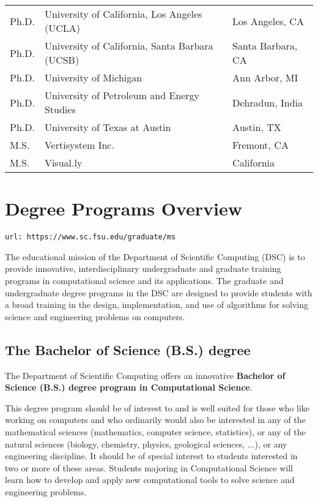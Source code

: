 \documentclass[12pt,a4paper]{article}
\begin{document}
\begin{center}
\begin{tabular}{l p{8cm} l}
Ph.D. & University of California, Los Angeles (UCLA) & Los Angeles, CA \\
Ph.D. & University of California, Santa Barbara (UCSB) & Santa Barbara, CA \\
Ph.D. & University of Michigan & Ann Arbor, MI \\
Ph.D. & University of Petroleum and Energy Studies & Dehradun, India \\
Ph.D. & University of Texas at Austin & Austin, TX \\
M.S. & Vertisystem Inc. & Fremont, CA \\
M.S. & Visual.ly & California \\
\hline
\end{tabular}
\end{center}

\section{Degree Programs Overview}
\texttt{url: https://www.sc.fsu.edu/graduate/ms}

The educational mission of the Department of Scientific Computing (DSC) is to provide innovative, interdisciplinary undergraduate and graduate training programs in computational science and its applications. The graduate and undergraduate degree programs in the DSC are designed to provide students with a broad training in the design, implementation, and use of algorithms for solving science and engineering problems on computers.

\subsection*{The Bachelor of Science (B.S.) degree}
The Department of Scientific Computing offers an innovative \textbf{Bachelor of Science (B.S.) degree program in Computational Science}.

This degree program should be of interest to and is well suited for those who like working on computers and who ordinarily would also be interested in any of the mathematical sciences (mathematics, computer science, statistics), or any of the natural sciences (biology, chemistry, physics, geological sciences, ...), or any engineering discipline. It should be of special interest to students interested in two or more of these areas. Students majoring in Computational Science will learn how to develop and apply new computational tools to solve science and engineering problems.
\end{document}
